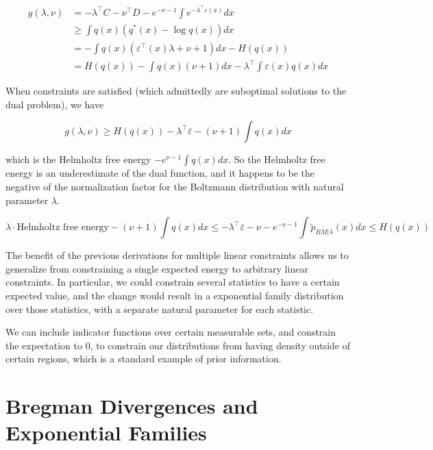 \documentclass[a4paper]{article}
\begin{document}
\begin{equation}
  \begin{split}
    g(\lambda,\nu) &= - \lambda^\intercal C - \nu^\intercal D - e^{ - \nu - 1} \int e^{ - \lambda^\intercal \varepsilon(x)} dx \\
    &\geq \int q(x) \left( q^*(x)- \log q(x) \right) dx \\
    &= - \int q(x) \left( \varepsilon^\intercal(x) \lambda + \nu + 1 \right) dx - H(q(x)) \\
    &= H(q(x)) - \int q(x) \left( \nu + 1 \right) dx - \lambda^\intercal \int \varepsilon(x) q(x) dx
  \end{split}
  \label{}
\end{equation}

When constraints are satisfied (which admittedly are suboptimal solutions to the dual problem), we have 

\begin{equation}
  g(\lambda,\nu) \geq H(q(x)) - \lambda^\intercal \bar{\varepsilon} - (\nu +1) \int q(x) dx
  \label{}
\end{equation}

which is the Helmholtz free energy $-e^{\nu-1} \int q(x) dx$.  So the Helmholtz free energy is an underestimate of the dual function, and it happens to be the negative of the normalization factor for the Boltzmann distribution with natural parameter $\lambda$.

\begin{equation}
  \lambda \cdot \text{Helmholtz free energy} - (\nu+1) \int q(x) dx \leq -\lambda^\intercal \bar{\varepsilon} - \nu - e^{-\nu-1}\int \tilde{p}_{BM \vert \lambda} (x) dx \leq H(q(x))
  \label{}
\end{equation}

The benefit of the previous derivations for multiple linear constraints allows us to generalize from constraining a single expected energy to arbitrary linear constraints.  
In particular, we could constrain several statistics to have a certain expected value, and the change would result in a exponential family distribution over those statistics, with a separate natural parameter for each statistic.

We can include indicator functions over certain measurable sets, and constrain the expectation to 0, to constrain our distributions from having density outside of certain regions, which is a standard example of prior information.

\section{Bregman Divergences and Exponential Families}
\end{document}
